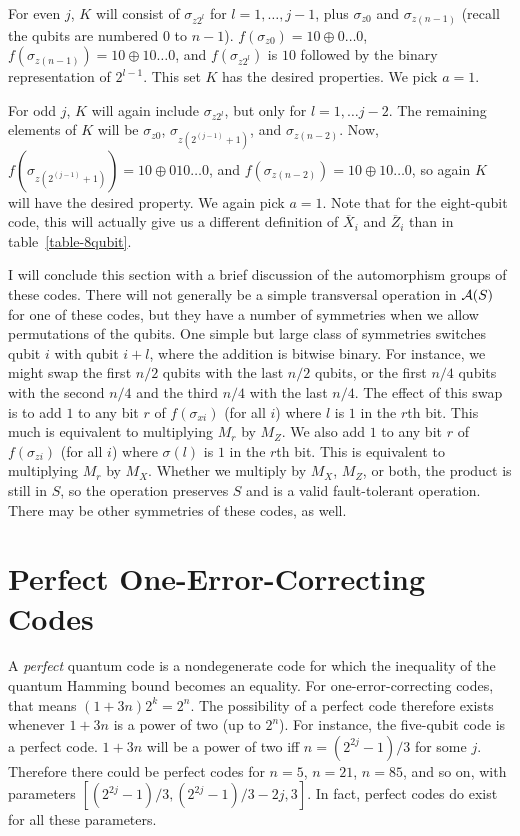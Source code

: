 \documentclass{report}
\newcommand{\Xs}[1]{\sigma_{x{#1}}}
\newcommand{\Zs}[1]{\sigma_{z{#1}}}
\newcommand{\Xbar}{\overline{X}}
\newcommand{\Zbar}{\overline{Z}}
\newcommand{\A}{{\cal A}}
\begin{document}
For even $j$, $K$ will consist of $\Zs{2^l}$ for $l = 1, \ldots, j-1$, plus 
$\Zs{0}$ and $\Zs{(n-1)}$ (recall the qubits are numbered $0$ to $n-1$).  $f 
(\Zs{0}) = 1 0 \oplus 0 \ldots 0$, $f (\Zs{(n-1)}) = 10 \oplus 1 0 \ldots 0$, 
and $f (\Zs{2^l})$ is $1 0$ followed by the binary representation of $2^{l-1}$. 
This set $K$ has the desired properties.  We pick $a=1$.

For odd $j$, $K$ will again include $\Zs{2^l}$, but only for $l = 1, \ldots j-
2$.  The remaining elements of $K$ will be $\Zs{0}$, $\Zs{(2^{(j-1)} + 1)}$, 
and $\Zs{(n-2)}$.  Now, $f(\Zs{(2^{(j-1)}+1)}) = 1 0 \oplus 0 1 0 \ldots 0$, 
and $f (\Zs{(n-2)}) = 1 0 \oplus 1 0 \ldots 0$, so again $K$ will have the 
desired property.  We again pick $a=1$.  Note that for the eight-qubit code, 
this will actually give us a different definition of $\Xbar_i$ and $\Zbar_i$ 
than in table~\ref{table-8qubit}.

I will conclude this section with a brief discussion of the automorphism 
groups of these codes.  There will not generally be a simple transversal 
operation in $\A(S)$ for one of these codes, but they have a number of 
symmetries when we allow permutations of the qubits.  One simple but 
large class of symmetries switches qubit $i$ with qubit $i + l$, where the 
addition is bitwise binary.  For instance, we might swap the first $n/2$ 
qubits with the last $n/2$ qubits, or the first $n/4$ qubits with the second 
$n/4$ and the third $n/4$ with the last $n/4$.  The effect of this swap is 
to add $1$ to any bit $r$ of $f(\Xs{i})$ (for all $i$) where $l$ is $1$ in the 
$r$th bit.  This much is equivalent to multiplying $M_r$ by $M_Z$.  We 
also add $1$ to any bit $r$ of $f(\Zs{i})$ (for all $i$) where $\sigma (l)$ is 
$1$ in the $r$th bit.  This is equivalent to multiplying $M_r$ by $M_X$.  
Whether we multiply by $M_X$, $M_Z$, or both, the product is still in $S$, 
so the operation preserves $S$ and is a valid fault-tolerant operation.  
There may be other symmetries of these codes, as well.

\section{Perfect One-Error-Correcting Codes}
\label{sec-perfect}

A {\em perfect} quantum code is a nondegenerate code for which the 
inequality of the quantum Hamming bound becomes an equality.  For
one-error-correcting codes, that means $(1+3n)2^k = 2^n$.  The possibility 
of a perfect code therefore exists whenever $1+3n$ is a power of two (up 
to $2^n$).  For instance, the five-qubit code is a perfect code.  $1+3n$ will 
be a power of two iff $n = (2^{2j} - 1)/3$ for some $j$.  Therefore there could 
be perfect codes for $n=5$, $n=21$, $n=85$, and so on, with parameters 
$[(2^{2j}-1)/3, (2^{2j}-1)/3 - 2j, 3]$.  In fact, perfect codes do exist for 
all these parameters.
\end{document}
